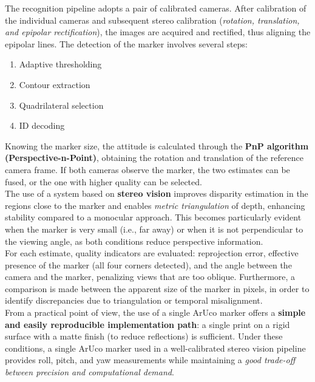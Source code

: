 The recognition pipeline adopts a pair of calibrated cameras. After calibration of the individual cameras and subsequent stereo calibration (\textit{rotation, translation, and epipolar rectification}), the images are acquired and rectified, thus aligning the epipolar lines. The detection of the marker involves several steps:

\begin{enumerate}
    \item Adaptive thresholding
    \item Contour extraction
    \item Quadrilateral selection
    \item ID decoding\\
\end{enumerate}

Knowing the marker size, the attitude is calculated through the \textbf{PnP algorithm (Perspective-n-Point)}, obtaining the rotation and translation of the reference camera frame. If both cameras observe the marker, the two estimates can be fused, or the one with higher quality can be selected.\\

The use of a system based on \textbf{stereo vision} improves disparity estimation in the regions close to the marker and enables \textit{metric triangulation} of depth, enhancing stability compared to a monocular approach. This becomes particularly evident when the marker is very small (i.e., far away) or when it is not perpendicular to the viewing angle, as both conditions reduce perspective information.\\

For each estimate, quality indicators are evaluated: reprojection error, effective presence of the marker (all four corners detected), and the angle between the camera and the marker, penalizing views that are too oblique. Furthermore, a comparison is made between the apparent size of the marker in pixels, in order to identify discrepancies due to triangulation or temporal misalignment. \\

From a practical point of view, the use of a single ArUco marker offers a \textbf{simple and easily reproducible implementation path}: a single print on a rigid surface with a matte finish (to reduce reflections) is sufficient. Under these conditions, a single ArUco marker used in a well-calibrated stereo vision pipeline provides roll, pitch, and yaw measurements while maintaining a \textit{good trade-off between precision and computational demand}.
